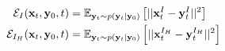 \begin{align}
   \mathcal{E}_I(\mathbf{x}_t, \mathbf{y}_0, t)     & = \mathbb{E}_{\mathbf{y}_t \sim p(\mathbf{y}_t | \mathbf{y}_0)}\left[|| \mathbf{x}^I_t - \mathbf{y}^I_t ||^2\right] \label{eqn:energy-intensities}                   \\
   \mathcal{E}_{I_H}(\mathbf{x}_t, \mathbf{y}_0, t) & = \mathbb{E}_{\mathbf{y}_t \sim p(\mathbf{y}_t | \mathbf{y}_0)}\left[|| \mathbf{x}^{I_H}_t - \mathbf{y}^{I_H}_t ||^2\right] \label{eqn:energy-high-freq-intensities}
\end{align}



